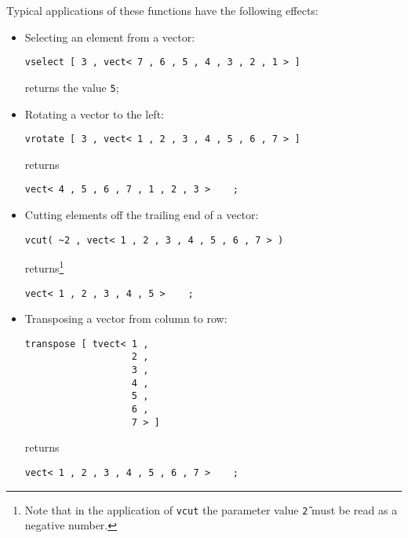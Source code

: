 Typical applications of these functions have the following
 effects:
\begin{itemize}
\item Selecting an element from a vector:
\begin{verbatim}
vselect [ 3 , vect< 7 , 6 , 5 , 4 , 3 , 2 , 1 > ]
\end{verbatim}
returns the value {\tt 5};
\item Rotating a vector to the left: 
\begin{verbatim}
vrotate [ 3 , vect< 1 , 2 , 3 , 4 , 5 , 6 , 7 > ]
\end{verbatim}
returns
\begin{verbatim}
vect< 4 , 5 , 6 , 7 , 1 , 2 , 3 >    ;
\end{verbatim}
\item Cutting elements off the trailing end of a vector: 
\begin{verbatim}
vcut( ~2 , vect< 1 , 2 , 3 , 4 , 5 , 6 , 7 > )
\end{verbatim}
returns\footnote{Note that in the application of {\tt vcut} the 
parameter value
{\tt \~2} must be read as a negative number.}
\begin{verbatim}
vect< 1 , 2 , 3 , 4 , 5 >    ;
\end{verbatim}
\item Transposing a vector from column to row: 
\begin{verbatim}
transpose [ tvect< 1 ,
                   2 ,
                   3 ,
                   4 ,
                   5 ,
                   6 ,
                   7 > ]
\end{verbatim}
returns
\begin{verbatim}
vect< 1 , 2 , 3 , 4 , 5 , 6 , 7 >    ;
\end{verbatim}

\end{itemize}
